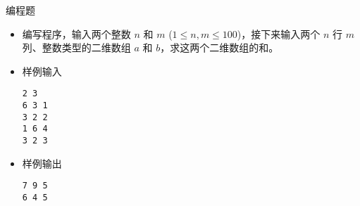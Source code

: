 \begin{frame}[fragile]
{\begin{exampleblock}{编程题}
            \begin{itemize}
                \item 编写程序，输入两个整数 $n$ 和 $m$ ($1 \le n, m \le 100$)，接下来输入两个 $n$ 行 $m$ 列、整数类型的二维数组 $a$ 和 $b$，求这两个二维数组的和。

                \item 样例输入

                    \lstinline|2 3|\\
                    \lstinline|6 3 1|\\
                    \lstinline|3 2 2|\\
                    \lstinline|1 6 4|\\
                    \lstinline|3 2 3|

                \item 样例输出

                    \lstinline|7 9 5|\\
                    \lstinline|6 4 5|

            \end{itemize}

        \end{exampleblock}
    }
\end{frame}

